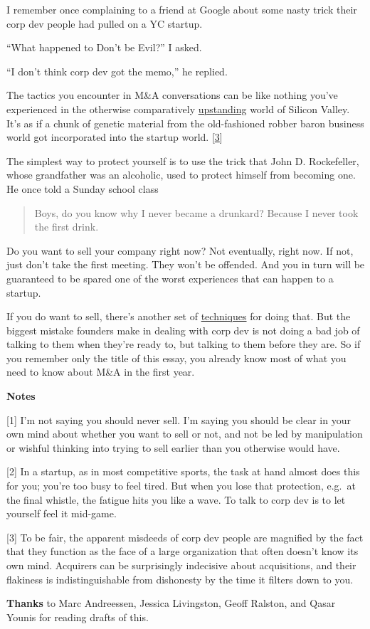 I remember once complaining to a friend at Google about some nasty trick
their corp dev people had pulled on a YC startup.

``What happened to Don't be Evil?'' I asked.

``I don't think corp dev got the memo,'' he replied.

The tactics you encounter in M\&A conversations can be like nothing
you've experienced in the otherwise comparatively
\href{mean.html}{upstanding} world of Silicon Valley. It's as if a chunk
of genetic material from the old-fashioned robber baron business world
got incorporated into the startup world. {[}\hyperref[f3n]{3}{]}

The simplest way to protect yourself is to use the trick that John D.
Rockefeller, whose grandfather was an alcoholic, used to protect himself
from becoming one. He once told a Sunday school class

\begin{quote}
Boys, do you know why I never became a drunkard? Because I never took
the first drink.
\end{quote}

Do you want to sell your company right now? Not eventually, right now.
If not, just don't take the first meeting. They won't be offended. And
you in turn will be guaranteed to be spared one of the worst experiences
that can happen to a startup.

If you do want to sell, there's another set of
\href{https://justinkan.com/the-founders-guide-to-selling-your-company-a1b2025c9481}{techniques}
for doing that. But the biggest mistake founders make in dealing with
corp dev is not doing a bad job of talking to them when they're ready
to, but talking to them before they are. So if you remember only the
title of this essay, you already know most of what you need to know
about M\&A in the first year.

\textbf{Notes}

{[}1{]} I'm not saying you should never sell. I'm saying you should be
clear in your own mind about whether you want to sell or not, and not be
led by manipulation or wishful thinking into trying to sell earlier than
you otherwise would have.

{[}2{]} In a startup, as in most competitive sports, the task at hand
almost does this for you; you're too busy to feel tired. But when you
lose that protection, e.g.~at the final whistle, the fatigue hits you
like a wave. To talk to corp dev is to let yourself feel it mid-game.

{[}3{]} To be fair, the apparent misdeeds of corp dev people are
magnified by the fact that they function as the face of a large
organization that often doesn't know its own mind. Acquirers can be
surprisingly indecisive about acquisitions, and their flakiness is
indistinguishable from dishonesty by the time it filters down to you.

\textbf{Thanks} to Marc Andreessen, Jessica Livingston, Geoff Ralston,
and Qasar Younis for reading drafts of this.
